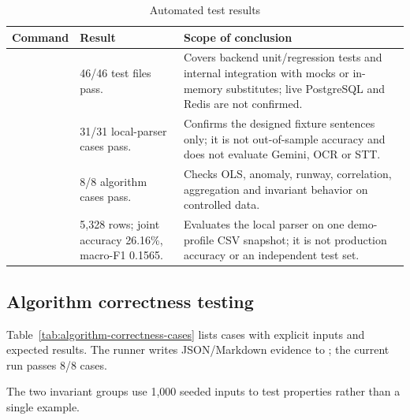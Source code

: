 \begin{table}[H]
  \centering
  \caption{Automated test results}
  \label{tab:automated-test-results}
  \begin{tabularx}{\textwidth}{@{}L{3.3cm}L{2.8cm}Y@{}}
    \toprule
    \textbf{Command} & \textbf{Result} & \textbf{Scope of conclusion} \\
    \midrule
     & 46/46 test files pass. & Covers backend unit/regression tests and internal integration with mocks or in-memory substitutes; live PostgreSQL and Redis are not confirmed. \\
     & 31/31 local-parser cases pass. & Confirms the designed fixture sentences only; it is not out-of-sample accuracy and does not evaluate Gemini, OCR or STT. \\
     & 8/8 algorithm cases pass. & Checks OLS, anomaly, runway, correlation, aggregation and invariant behavior on controlled data. \\
     & 5,328 rows; joint accuracy 26.16\%, macro-F1 0.1565. & Evaluates the local parser on one demo-profile CSV snapshot; it is not production accuracy or an independent test set. \\
    \bottomrule
  \end{tabularx}
\end{table}

\subsection{Algorithm correctness testing}

Table~\ref{tab:algorithm-correctness-cases} lists cases with explicit inputs and expected results. The runner writes JSON/Markdown evidence to ; the current run passes 8/8 cases.

The two invariant groups use 1,000 seeded inputs to test properties rather than a single example.

